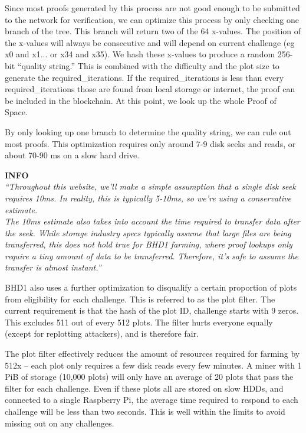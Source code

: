 \begin{flushleft}
    Since most proofs generated by this process are not good enough to be submitted to the network for verification, we can optimize this process by only checking one branch of the tree. This branch will return two of the 64 x-values. The position of the x-values will always be consecutive and will depend on current challenge (eg x0 and x1... or x34 and x35). We hash these x-values to produce a random 256-bit ``quality string.'' This is combined with the difficulty and the plot size to generate the required\_iterations. If the required\_iterations is less than every required\_iterations those are found from local storage or internet, the proof can be included in the blockchain. At this point, we look up the whole Proof of Space.
\end{flushleft}
\begin{flushleft}
    By only looking up one branch to determine the quality string, we can rule out most proofs. This optimization requires only around 7-9 disk seeks and reads, or about 70-90 ms on a slow hard drive.
\end{flushleft}
\begin{flushleft}
    \textbf{INFO}\\[5pt]
    \textit{``Throughout this website, we'll make a simple assumption that a single disk seek requires 10ms. In reality, this is typically 5-10ms, so we're using a conservative estimate.\\[5pt]
    The 10ms estimate also takes into account the time required to transfer data after the seek. While storage industry specs typically assume that large files are being transferred, this does not hold true for BHD1 farming, where proof lookups only require a tiny amount of data to be transferred. Therefore, it's safe to assume the transfer is almost instant.''}
\end{flushleft}
\begin{flushleft}
    BHD1 also uses a further optimization to disqualify a certain proportion of plots from eligibility for each challenge. This is referred to as the plot filter. The current requirement is that the hash of the plot ID, challenge starts with 9 zeros. This excludes 511 out of every 512 plots. The filter hurts everyone equally (except for replotting attackers), and is therefore fair.
\end{flushleft}
\begin{flushleft}
    The plot filter effectively reduces the amount of resources required for farming by 512x -- each plot only requires a few disk reads every few minutes. A miner with 1 PiB of storage (10,000 plots) will only have an average of 20 plots that pass the filter for each challenge. Even if these plots all are stored on slow HDDs, and connected to a single Raspberry Pi, the average time required to respond to each challenge will be less than two seconds. This is well within the limits to avoid missing out on any challenges.
\end{flushleft}

